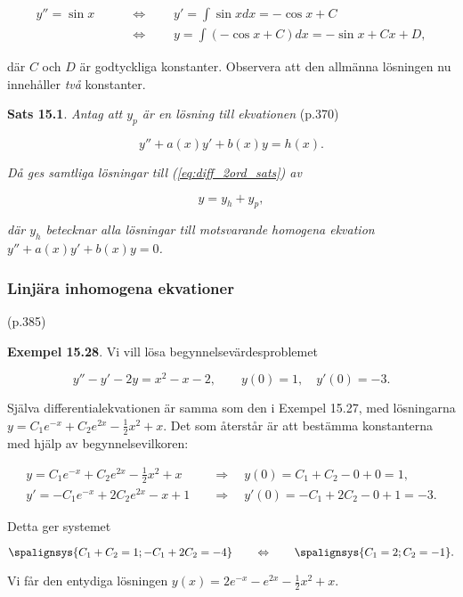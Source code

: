 \documentclass[11pt]{article}
\begin{document}
\begin{align}
    y'' = \sin x \qquad &\Leftrightarrow \qquad  y' = \int \sin x dx = -\cos x + C\\
                 \qquad &\Leftrightarrow \qquad y = \int (-\cos x + C) dx = -\sin x + Cx + D,
\end{align}

där $C$ och $D$ är godtyckliga konstanter. Observera att den allmänna lösningen nu innehåller \textit{två} konstanter.

\textbf{Sats 15.1}. \textit{Antag att $y_p$ är en lösning till ekvationen} (p.370)

\begin{equation}
    y'' + a(x)y' + b(x)y = h(x).
    \label{eq:diff_2ord_sats}
\end{equation}

\textit{Då ges samtliga lösningar till (\ref{eq:diff_2ord_sats}) av}

\begin{equation}
    y = y_h + y_p,
\end{equation}

\textit{där $y_h$ betecknar alla lösningar till motsvarande homogena ekvation $y'' + a(x)y' + b(x)y = 0$.}

\newpage
\subsubsection{Linjära inhomogena ekvationer} (p.385)

\textbf{Exempel 15.28}. Vi vill lösa begynnelsevärdesproblemet

\begin{equation}
    y'' - y' - 2y = x^2 - x - 2, \qquad y(0) = 1, \quad y'(0) = -3.
\end{equation}

Själva differentialekvationen är samma som den i Exempel 15.27, med lösningarna $y = C_1e^{-x} + C_2e^{2x}-\frac{1}{2}x^2 + x$. Det som återstår är att bestämma konstanterna med hjälp av begynnelsevilkoren:

\begin{align}
    y  = C_1e^{-x} + C_2e^{2x} - \tfrac{1}{2}x^2 + x \quad &\Rightarrow \quad y(0)  = C_1 + C_2 - 0 + 0 = 1,\\
    y' = -C_1e^{-x} + 2C_2e^{2x} - x + 1             \quad &\Rightarrow \quad y'(0) = -C_1 + 2C_2 - 0 + 1 = -3.
\end{align}

Detta ger systemet

\begin{equation}
    \spalignsys{
         C_1 +  C_2 =  1;
        -C_1 + 2C_2 = -4
    }
    \qquad \Leftrightarrow \qquad
    \spalignsys{
        C_1 = 2;
        C_2 = -1
    }.
\end{equation}

Vi får den entydiga lösningen $y(x) = 2e^{-x} - e^{2x} - \tfrac{1}{2}x^2 + x$.
\end{document}
